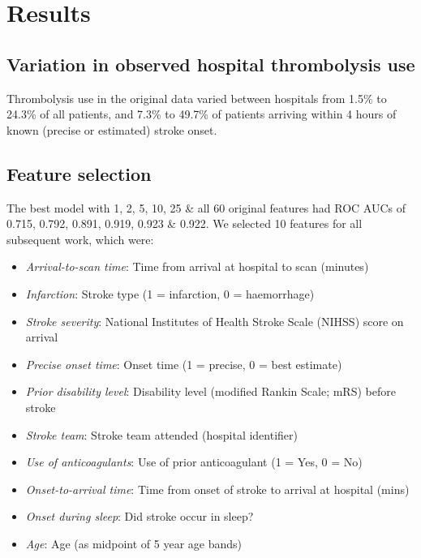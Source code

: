 \section{Results}

\subsection{Variation in observed hospital thrombolysis use}

Thrombolysis use in the original data varied between hospitals from 1.5\% to 24.3\% of all patients, and 7.3\% to 49.7\% of patients arriving within 4 hours of known (precise or estimated) stroke onset.


\subsection{Feature selection}

The best model with 1, 2, 5, 10, 25 \& all 60 original features had ROC AUCs of 0.715, 0.792, 0.891, 0.919, 0.923 \& 0.922. We selected 10 features for all subsequent work, which were:

\begin{itemize}
    \item \emph{Arrival-to-scan time}: Time from arrival at hospital to scan (minutes)
    \item \emph{Infarction}: Stroke type (1 = infarction, 0 = haemorrhage)
    \item \emph{Stroke severity}: National Institutes of Health Stroke Scale (NIHSS) score on arrival
    \item \emph{Precise onset time}: Onset time (1 = precise, 0 = best estimate)
    \item \emph{Prior disability level}: Disability level (modified Rankin Scale; mRS) before stroke
    \item \emph{Stroke team}: Stroke team attended (hospital identifier)
    \item \emph{Use of anticoagulants}: Use of prior anticoagulant (1 = Yes, 0 = No)
    \item \emph{Onset-to-arrival time}: Time from onset of stroke to arrival at hospital (mins)
    \item \emph{Onset during sleep}: Did stroke occur in sleep?
    \item \emph{Age}: Age (as midpoint of 5 year age bands)
\end{itemize}

